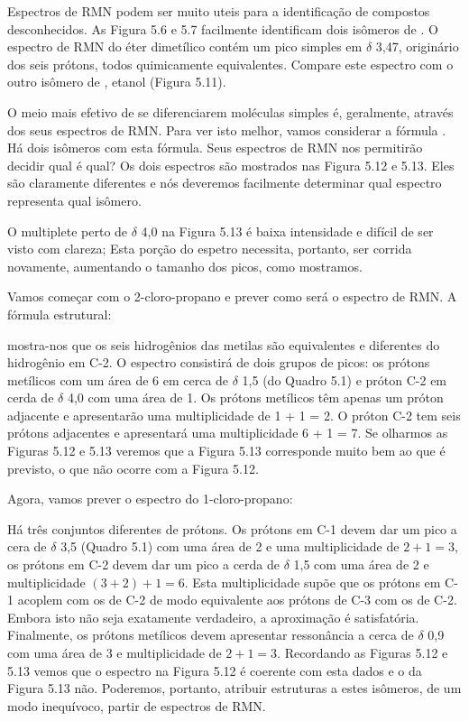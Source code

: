 Espectros de RMN podem ser muito uteis para a identificação de compostos desconhecidos. As Figura 5.6 e 5.7 facilmente identificam dois isômeros de . O espectro de RMN do éter dimetílico contém um pico simples em $\delta$ 3,47, originário dos seis prótons, todos quimicamente equivalentes. Compare este espectro com o outro isômero de , etanol (Figura 5.11).

O meio mais efetivo de se diferenciarem moléculas simples é, geralmente, através dos seus espectros de RMN. Para ver isto melhor, vamos considerar a fórmula . Há dois isômeros com esta fórmula. Seus espectros de RMN nos permitirão decidir qual é qual? Os dois espectros são mostrados nas Figura 5.12 e 5.13. Eles são claramente diferentes e nós deveremos facilmente determinar qual espectro representa qual isômero. 

O multiplete perto de $\delta$ 4,0 na Figura 5.13 é baixa intensidade e difícil de ser visto com clareza; Esta porção do espetro necessita, portanto, ser corrida novamente, aumentando o tamanho dos picos, como mostramos.

Vamos começar com o 2-cloro-propano e prever como será o espectro de RMN. A fórmula estrutural:

mostra-nos que os seis hidrogênios das metilas são equivalentes e diferentes do hidrogênio em C-2. O espectro consistirá de dois grupos de picos: os prótons metílicos com um área de 6 em cerca de $\delta$ 1,5 (do Quadro 5.1) e próton C-2 em cerda de $\delta$ 4,0 com uma área de 1. Os prótons metílicos têm apenas um próton adjacente e apresentarão uma multiplicidade de 1 + 1 = 2. O próton C-2 tem seis prótons adjacentes e apresentará uma multiplicidade 6 + 1 = 7. Se olharmos as Figuras 5.12 e 5.13 veremos que a Figura 5.13 corresponde muito bem ao que é previsto, o que não ocorre com a Figura 5.12. 

Agora, vamos prever o espectro do 1-cloro-propano:

Há três conjuntos diferentes de prótons. Os prótons em C-1 devem dar um pico a cera de $\delta$ 3,5 (Quadro 5.1) com uma área de 2 e uma multiplicidade de $2 + 1 = 3$, os prótons em C-2 devem dar um pico a cerda de $\delta$ 1,5 com uma área de 2 e multiplicidade $(3 + 2) + 1 = 6$. Esta multiplicidade supõe que os prótons em C-1 acoplem com os de C-2 de modo equivalente aos prótons de C-3 com os de C-2. Embora isto não seja exatamente verdadeiro, a aproximação é satisfatória. Finalmente, os prótons metílicos devem apresentar ressonância a cerca de $\delta$ 0,9 com uma área de 3 e multiplicidade de $2 + 1 =3$. Recordando as Figuras 5.12 e 5.13 vemos que o espectro na Figura 5.12 é coerente com esta dados e o da Figura 5.13 não. Poderemos, portanto, atribuir estruturas a estes isômeros, de um modo inequívoco, partir de espectros de RMN.


